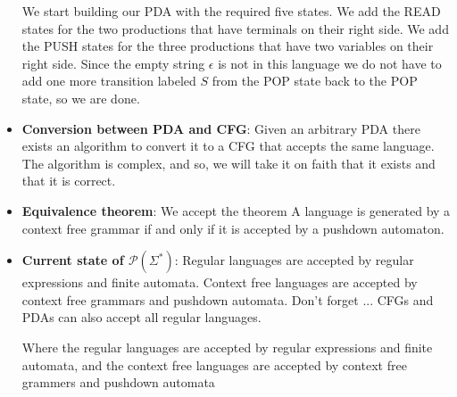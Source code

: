\documentclass{report}
\begin{document}
\begin{itemize}
            \bigbreak \noindent 
            We start building our PDA with the required five states.
            \bigbreak \noindent 
            We add the READ states for the two productions that have terminals on their right side.
            \bigbreak \noindent 
            We add the PUSH states for the three productions that have two variables on their right side.
            \bigbreak \noindent 
            Since the empty string $\epsilon$ is not in this language we do not have to add one more transition labeled $S$ from the POP state back to the POP state, so we are done.
        \item \textbf{Conversion between PDA and CFG}: Given an arbitrary PDA there exists an algorithm to convert it to a CFG that accepts the same language.
            \bigbreak \noindent 
            The algorithm is complex, and so, we will take it on faith that it exists and that it is correct.
        \item \textbf{Equivalence theorem}: We accept the theorem
            \bigbreak \noindent 
            A language is generated by a context free grammar if and only if it is accepted by a pushdown automaton.
        \item \textbf{Current state of  $\mathcal{P}(\Sigma^{*})$}:
            Regular languages are accepted by regular expressions and finite automata.
            \bigbreak \noindent 
            Context free languages are accepted by context free grammars and pushdown automata.
            \bigbreak \noindent 
            Don't forget ... CFGs and PDAs can also accept all regular languages.
            \begin{figure}[ht]
                \centering
                \label{fig:rc1}
            \end{figure}
            \bigbreak \noindent 
            Where the regular languages are accepted by regular expressions and finite automata, and the context free languages are accepted by context free grammers and pushdown automata





    \end{itemize}

    \pagebreak 
\end{document}
